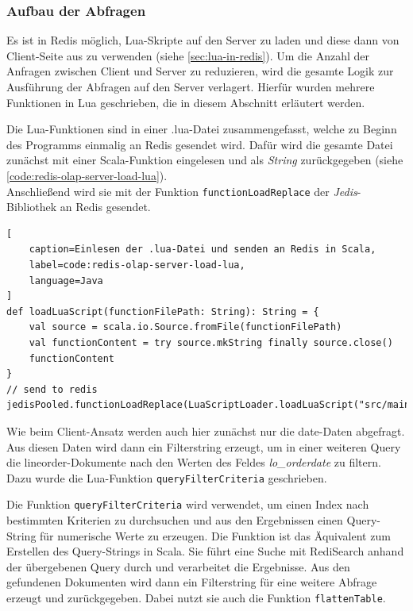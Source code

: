 \subsubsection{Aufbau der Abfragen}
Es ist in Redis möglich, Lua-Skripte auf den Server zu laden und diese dann von Client-Seite aus zu verwenden (siehe \cref{sec:lua-in-redis}).
Um die Anzahl der Anfragen zwischen Client und Server zu reduzieren, wird die gesamte Logik zur Ausführung der Abfragen auf den Server verlagert. Hierfür wurden mehrere Funktionen in Lua geschrieben, die in diesem Abschnitt erläutert werden.

Die Lua-Funktionen sind in einer .lua-Datei zusammengefasst, welche zu Beginn des Programms einmalig an Redis gesendet wird. Dafür wird die gesamte Datei zunächst mit einer Scala-Funktion eingelesen und als \emph{String} zurückgegeben (siehe \cref{code:redis-olap-server-load-lua}).\\
Anschließend wird sie mit der Funktion \lstinline|functionLoadReplace| der \emph{Jedis}-Bibliothek an Redis gesendet.

\begin{lstlisting}[
    caption=Einlesen der .lua-Datei und senden an Redis in Scala,
    label=code:redis-olap-server-load-lua,
    language=Java
]
def loadLuaScript(functionFilePath: String): String = {
	val source = scala.io.Source.fromFile(functionFilePath)
	val functionContent = try source.mkString finally source.close()
	functionContent
}
// send to redis
jedisPooled.functionLoadReplace(LuaScriptLoader.loadLuaScript("src/main/resources/olaplibrary.lua"))
\end{lstlisting}





Wie beim Client-Ansatz werden auch hier zunächst nur die date-Daten abgefragt. Aus diesen Daten wird dann ein Filterstring erzeugt, um in einer weiteren Query die lineorder-Dokumente nach den Werten des Feldes \emph{lo\_orderdate} zu filtern. Dazu wurde die Lua-Funktion \lstinline|queryFilterCriteria| geschrieben.

Die Funktion \lstinline|queryFilterCriteria| wird verwendet, um einen Index nach bestimmten Kriterien zu durchsuchen und aus den Ergebnissen einen Query-String für numerische Werte zu erzeugen. Die Funktion ist das Äquivalent zum Erstellen des Query-Strings in Scala.
Sie führt eine Suche mit RediSearch anhand der übergebenen Query durch und verarbeitet die Ergebnisse. Aus den gefundenen Dokumenten wird dann ein Filterstring für eine weitere Abfrage erzeugt und zurückgegeben. Dabei nutzt sie auch die Funktion \lstinline|flattenTable|.

